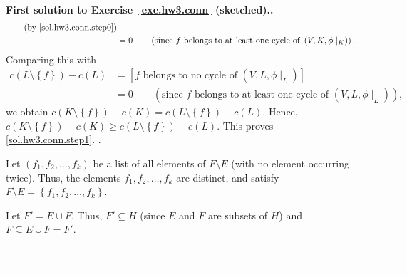 \documentclass[numbers=enddot,12pt,final,onecolumn,notitlepage]{scrartcl}%
\theoremstyle{definition}
\newenvironment{proof}[1][Proof]{\noindent\textbf{#1.} }{\ \rule{0.5em}{0.5em}}
\newcommand{\set}[1]{\left\{ #1 \right\}}
\newcommand{\tup}[1]{\left( #1 \right)}
\newcommand{\ive}[1]{\left[ #1 \right]}
\begin{document}
\begin{proof}[First solution to Exercise~\ref{exe.hw3.conn}
(sketched).]
{\begin{align*}
  \qquad \left(\text{by \eqref{sol.hw3.conn.step0}}\right) \\
  &= 0
  \qquad \left(\text{since } f
                \text{ belongs to at least one cycle of }
                \tup{V, K, \phi\mid_K} \right) .
  \end{align*}
  Comparing this with
  \begin{align*}
  c\tup{L \setminus \set{f}} - c\tup{L}
  &= \ive{f \text{ belongs to no cycle of } \tup{V, L, \phi\mid_L}}
  \\
  &= 0
  \qquad \left(\text{since } f
                \text{ belongs to at least one cycle of }
                \tup{V, L, \phi\mid_L} \right) ,
  \end{align*}
  we obtain
  $c\tup{K \setminus \set{f}} - c\tup{K}
  = c\tup{L \setminus \set{f}} - c\tup{L}$.
  Hence,
  $c\tup{K \setminus \set{f}} - c\tup{K}
  \geq c\tup{L \setminus \set{f}} - c\tup{L}$.
  This proves \eqref{sol.hw3.conn.step1}.
}.

Let $\tup{f_1, f_2, \ldots, f_k}$ be a list of all elements of
$F \setminus E$ (with no element occurring twice).
Thus, the elements $f_1, f_2, \ldots, f_k$ are distinct,
and satisfy $F \setminus E = \set{f_1, f_2, \ldots, f_k}$.

Let $F' = E \cup F$. Thus, $F' \subseteq H$ (since $E$ and $F$ are
subsets of $H$) and $F \subseteq E \cup F = F'$.


\end{proof}
\end{document}
